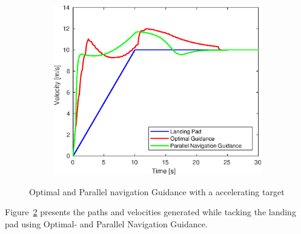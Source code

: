 \begin{figure}[ht!]
\begin{subfigure}[b]{.5\textwidth}
		\includegraphics[width=\linewidth]{img/plot/simulation/acceleration_vel.eps}
		\label{fig:acceleration_vel}
	\end{subfigure}
	\caption{Optimal and Parallel navigation Guidance with a accelerating target}\label{fig:accel_target}
\end{figure}
Figure~\ref{fig:accel_target} presents the paths and velocities generated while tacking the landing pad using Optimal- and Parallel Navigation Guidance.

